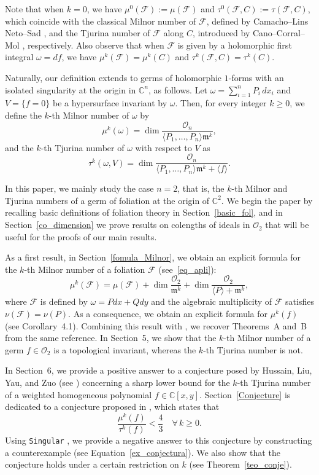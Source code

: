 \documentclass[12pt,letterpaper]{amsart}
\newcommand{\C}{\mathbb{C}}
\newcommand{\F}{\mathcal{F}}
\newcommand{\m}{\mathfrak{m}}
\begin{document}
\par Note that when $k = 0$, we have $\mu^{0}(\F) := \mu(\F)$ and $\tau^{0}(\F,C) := \tau(\F,C)$, which coincide with the classical Milnor number of $\F$, defined by Camacho–Lins Neto–Sad \cite{CLS}, and the Tjurina number of $\F$ along $C$, introduced by Cano–Corral–Mol \cite{Cano}, respectively. Also observe that when $\F$ is given by a holomorphic first integral $\omega = df$, we have $\mu^{k}(\F) = \mu^{k}(C)$ and $\tau^{k}(\F,C) = \tau^{k}(C)$.

\par Naturally, our definition extends to germs of holomorphic $1$-forms with an isolated singularity at the origin in $\C^n$, as follows. Let $\omega = \sum_{i=1}^{n} P_i\,dx_i$ and $V = \{ f = 0 \}$ be a hypersurface invariant by $\omega$. Then, for every integer $k \geq 0$, we define the $k$-th Milnor number of $\omega$ by
\[
\mu^{k}(\omega) = \dim \frac{\mathcal{O}_n}{\langle P_1, \ldots, P_n \rangle \m^k},
\]
and the $k$-th Tjurina number of $\omega$ with respect to $V$ as
\[
\tau^{k}(\omega,V) = \dim \frac{\mathcal{O}_n}{\langle P_1, \ldots, P_n \rangle \m^k + \langle f \rangle}.
\]

\par In this paper, we mainly study the case $n = 2$, that is, the $k$-th Milnor and Tjurina numbers of a germ of foliation at the origin of $\C^2$. We begin the paper by recalling basic definitions of foliation theory in Section~\ref{basic_fol}, and in Section~\ref{co_dimension} we prove results on colengths of ideals in $\mathcal{O}_2$ that will be useful for the proofs of our main results.

As a first result, in Section~\ref{fomula_Milnor}, we obtain an explicit formula for the $k$-th Milnor number of a foliation $\F$ (see~\eqref{eq_apli}):
\[
\mu^{k}(\F) = \mu(\F) + \dim \frac{\mathcal{O}_2}{\m^{k}} + \dim \frac{\mathcal{O}_2}{\langle P \rangle + \m^{k}},
\]
where $\F$ is defined by $\omega=Pdx+Qdy$ and the algebraic multiplicity of $\F$ satisfies $\nu(\F)=\nu(P)$. As a consequence, we obtain an explicit formula for $\mu^{k}(f)$ (see Corollary~4.1).  
Combining this result with \cite[Proposition~2.6]{k-Milnor}, we recover Theorems~A and~B from the same reference.  
In Section~5, we show that the $k$-th Milnor number of a germ $f \in \mathcal{O}_2$ is a topological invariant, whereas the $k$-th Tjurina number is not.  
\par In Section~6, we provide a positive answer to a conjecture posed by Hussain, Liu, Yau, and Zuo (see \cite[Conjecture~1.1]{k-Milnor}) concerning a sharp lower bound for the $k$-th Tjurina number of a weighted homogeneous polynomial $f \in \C[x,y]$.
 Section~\ref{Conjecture} is dedicated to a conjecture proposed in \cite[Conjecture~1.3]{Hussain_1}, which states that
\[
\frac{\mu^{k}(f)}{\tau^{k}(f)} < \frac{4}{3} \quad \forall \, k \geq 0.
\]
Using \texttt{Singular} \cite{Singular}, we provide a negative answer to this conjecture by constructing a counterexample (see Equation~\eqref{ex_conjectura}). We also show that the conjecture holds under a certain restriction on $k$ (see Theorem~\ref{teo_conje}).  
\end{document}

